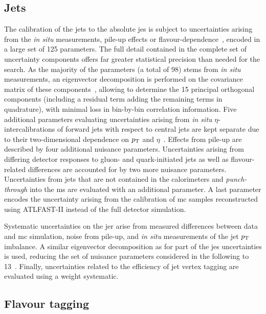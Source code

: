 \subsection{Jets}

The calibration of the jets to the absolute \gls{jes} is subject to uncertainties arising \eg from the \textit{in situ} measurements, pile-up effects or flavour-dependence~\cite{Aad:2020flx}, encoded in a large set of 125 parameters. The full detail contained in the complete set of uncertainty components offers far greater statistical precision than needed for the \onelepton search. As the majority of the parameters (a total of 98) stems from \textit{in situ} measurements, an eigenvector decomposition is performed on the covariance matrix of these components~\cite{ATL-PHYS-PUB-2015-014}, allowing to determine the 15 principal orthogonal components (including a residual term adding the remaining terms in quadrature), with minimal loss in bin-by-bin correlation information. Five additional parameters evaluating uncertainties arising from \textit{in situ} $\eta$-intercalibrations of forward jets with respect to central jets are kept separate due to their two-dimensional dependence on $p_{\textrm{T}}$ and $\eta$~\cite{Aad:2020flx}. Effects from pile-up are described by four additional nuisance parameters. Uncertainties arising from differing detector responses to gluon- and quark-initiated jets as well as flavour-related differences are accounted for by two more nuisance parameters. Uncertainties from jets that are not contained in the calorimeters and \textit{punch-through} into the \gls{ms} are evaluated with an additional parameter. A last parameter encodes the uncertainty arising from the calibration of \gls{mc} samples reconstructed using \textsc{ATLFAST-II} instead of the full detector simulation.

Systematic uncertainties on the \gls{jer} arise from measured differences between data and \gls{mc} simulation, noise from pile-up, and \textit{in situ} measurements of the jet $p_{\textrm{T}}$ imbalance. A similar eigenvector decomposition as for part of the \gls{jes} uncertainties is used, reducing the set of nuisance parameters considered in the following to 13~\cite{Aad:2020flx}. Finally, uncertainties related to the efficiency of jet vertex tagging are evaluated using a weight systematic.

\subsection{Flavour tagging}
 
